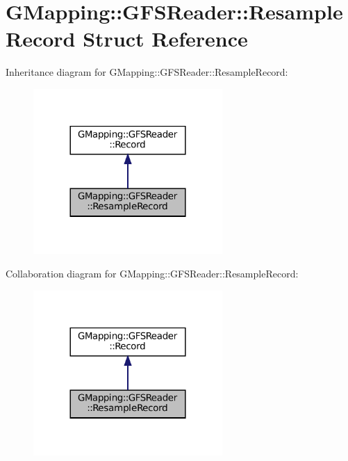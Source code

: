 \hypertarget{structGMapping_1_1GFSReader_1_1ResampleRecord}{}\section{G\+Mapping\+:\+:G\+F\+S\+Reader\+:\+:Resample\+Record Struct Reference}
\label{structGMapping_1_1GFSReader_1_1ResampleRecord}


Inheritance diagram for G\+Mapping\+:\+:G\+F\+S\+Reader\+:\+:Resample\+Record\+:
\nopagebreak
\begin{figure}[H]
\begin{center}
\leavevmode
\includegraphics[width=204pt]{structGMapping_1_1GFSReader_1_1ResampleRecord__inherit__graph}
\end{center}
\end{figure}


Collaboration diagram for G\+Mapping\+:\+:G\+F\+S\+Reader\+:\+:Resample\+Record\+:
\nopagebreak
\begin{figure}[H]
\begin{center}
\leavevmode
\includegraphics[width=204pt]{structGMapping_1_1GFSReader_1_1ResampleRecord__coll__graph}
\end{center}
\end{figure}
